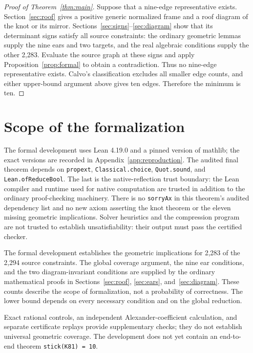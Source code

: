 \documentclass[11pt]{article}
\newcommand{\code}[1]{\nolinkurl{#1}}
\begin{document}
\begin{samepage}
\begin{proof}[Proof of Theorem~\ref{thm:main}]
Suppose that a nine-edge representative exists. Section~\ref{sec:roof}
gives a positive generic normalized frame and a roof diagram of the knot
or its mirror. Sections~\ref{sec:signs}--\ref{sec:diagram} show that its
determinant signs satisfy all source constraints: the ordinary
geometric lemmas supply the nine ears and two targets, and the real
algebraic conditions supply the other 2,283. Evaluate the source graph
at these signs and apply Proposition~\ref{prop:formal} to obtain a
contradiction. Thus no nine-edge representative exists. Calvo's
classification excludes all smaller edge counts, and either upper-bound
argument above gives ten edges. Therefore the minimum is ten.
\end{proof}

\end{samepage}
\section{Scope of the formalization}
The formal development uses Lean 4.19.0 and a pinned version of mathlib;
the exact versions are recorded in Appendix~\ref{app:reproduction}.
The audited final theorem depends on
\code{propext}, \code{Classical.choice}, \code{Quot.sound}, and
\code{Lean.ofReduceBool}. The last is the native-reflection trust
boundary: the Lean compiler and runtime used for native computation
are trusted in addition to the ordinary proof-checking machinery.
There is no \code{sorryAx} in this theorem's audited dependency list
and no new axiom asserting the knot theorem or the eleven missing
geometric implications. Solver heuristics and the compression program
are not trusted to establish unsatisfiability: their output must pass
the certified checker.

The formal development establishes the geometric implications for 2,283
of the 2,294 source constraints. The global coverage argument, the nine
ear conditions, and the two diagram-invariant conditions are supplied by
the ordinary mathematical proofs in Sections~\ref{sec:roof},
\ref{sec:ears}, and~\ref{sec:diagram}. These counts describe the scope
of formalization, not a probability of correctness. The lower bound
depends on every necessary condition and on the global reduction.

\begin{samepage}
Exact rational controls, an independent Alexander-coefficient calculation,
and separate certificate replays provide supplementary checks; they do
not establish universal geometric coverage. The development does not yet
contain an end-to-end theorem \code{stick(K81) = 10}.
\par\end{samepage}
\end{document}
